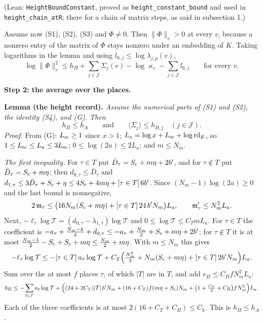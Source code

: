\documentclass[11pt,letterpaper]{article}
\begin{document}
\noindent(Lean: \texttt{HeightBoundConstant}, proved as \texttt{height\_constant\_bound} and used in
\texttt{height\_chain\_atR}; there for a chain of matrix steps, as said in subsection 1.)

Assume now (S1), (S2), (S3) and $\Phi\ne0$. Then $\|\Phi\|_v>0$ at every $v$, because a nonzero entry of
the matrix of $\Phi$ stays nonzero under an embedding of $K$. Taking logarithms in the lemma and using
$l_{6,j}\le\log\lambda_{j,p}(v)$,
\begin{equation}\label{sa:place}
 \log\|\Phi\|_v^2\le h_\Pi+\sum_{j\in\mathcal J}\Sigma_j(v)-\log\varkappa_v-\sum_{j\in\mathcal J}l_{6,j}
 \qquad\text{for every }v.
\end{equation}

\noindent\textbf{Step 2: the average over the places.}

\textbf{Lemma (the height record).} \emph{Assume the numerical parts of \textup{(S1)} and
\textup{(S2)}, the identity \textup{(S4)}, and \textup{(G)}. Then}
\begin{equation}\label{D:268}
 h_\Pi\le h_A\qquad\text{and}\qquad\langle\Sigma_j\rangle\le h_{B,j}\quad(j\in\mathcal J).
\end{equation}
\emph{Proof.} From (G): $L_{\rm sc}\ge1$ since $x>1$; $L_a=\log x+L_{\rm sc}+\log\mathrm{rd}_E$, so
$1\le L_{\rm sc}\le L_a\le3L_{\rm sc}$; $0\le\log(2a)\le2L_a$; and $m\le N_m$.

\emph{The first inequality.} For $\tau\in T$ put $\bar D_\tau=S_{\rm c}+m\eta+2b'$, and for
$\tau\notin T$ put $\bar D_\tau=S_{\rm c}+m\eta$; then $d_{0,\tau}\le\bar D_\tau$ and
$d_{1,\tau}\le3\bar D_\tau+S_{\rm c}+\eta\le4S_{\rm c}+4m\eta+[\tau\in T]\,6b'$. Since
$(N_m-1)\log(2a)\ge0$ and the last bound is nonnegative,
\begin{equation}\label{D:269}
 2\,\mathfrak m_\tau\le\big(16N_m(S_{\rm c}+m\eta)+[\tau\in T]\,24\,b'N_m\big)L_a,
 \qquad\mathfrak m_\tau'\le N_m^2L_a .
\end{equation}
Next, $-\ell_\tau\log\mathcal T=(d_{0,\tau}-\lambda_{1,\tau})\log\mathcal T$ and
$0\le\log\mathcal T\le C_TmL_a$. For $\tau\in T$ the coefficient is
$-a_\tau+\frac{N_m-k}2+d_{0,\tau}\le-a_\tau+\frac{N_m}2+S_{\rm c}+m\eta+2b'$; for $\tau\notin T$ it is at
most $\frac{N_m-1}2-S_{\rm c}+S_{\rm c}+m\eta\le\frac{N_m}2+m\eta$. With $m\le N_m$ this gives
\begin{equation}\label{D:270}
 -\ell_\tau\log\mathcal T\le-[\tau\in T]\,a_\tau\log\mathcal T
 +C_T\Big(\tfrac{N_m^2}2+N_m(S_{\rm c}+m\eta)+[\tau\in T]\,2b'N_m\Big)L_a .
\end{equation}
Sum over the at most $f$ places $\tau$, of which $|T|$ are in $T$, and add $e_\Pi\le C_\Pi fN_m^2L_a$:
\begin{equation}\label{D:271}
 h_\Pi\le-\sum_{t\in T}a_t\log\mathcal T+\Big((24+2C_T)|T|\,b'N_m+(16+C_T)f(m\eta+S_{\rm c})N_m
 +\big(1+\tfrac{C_T}2+C_\Pi\big)fN_m^2\Big)L_a .
\end{equation}
Each of the three coefficients is at most $2(16+C_T+C_\Pi)\le C_h$. This is $h_\Pi\le h_A$.
\end{document}
